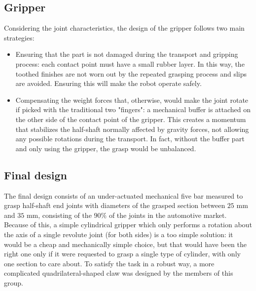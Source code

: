 \subsection{Gripper}
Considering the joint characteristics, the design of the gripper follows two main strategies: 
\begin{itemize}
	\item Ensuring that the part is not damaged during the transport and gripping process: each contact point must have a small rubber layer. In this way, the toothed finishes are not worn out by the repeated grasping process and slips are avoided. Ensuring this will make the robot operate safely.
	\item Compensating the weight forces that, otherwise, would make the joint rotate if picked with the traditional two "fingers": a mechanical buffer is attached on the other side of the contact point of the gripper. This creates a momentum that stabilizes the half-shaft normally affected by gravity forces, not allowing any possible rotations during the transport. In fact, without the buffer part and only using the gripper, the grasp would be unbalanced. 
\end{itemize} 

\subsection{Final design}
The final design consists of an under-actuated mechanical five bar measured to grasp half-shaft end joints with diameters of the grasped section between $25\text{ mm}$ and $35\text{ mm}$, consisting of the $90\%$ of the joints in the automotive market.
Because of this, a simple cylindrical gripper which only performs a rotation about the axis of a single revolute joint (for both sides) is a too simple solution: it would be a cheap and mechanically simple choice, but that would have been the right one only if it were requested to grasp a single type of cylinder, with only one section to care about. To satisfy the task in a robust way, a more complicated quadrilateral-shaped claw was designed by the members of this group.